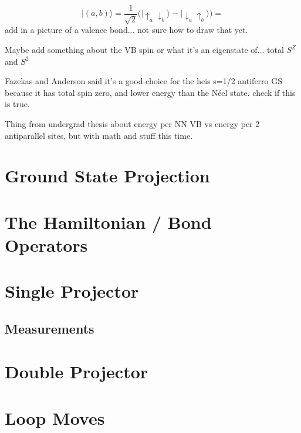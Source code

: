 \begin{equation}
   \lvert(a,b)\rangle = \frac{1}{\sqrt{2}}\big( \lvert \uparrow_a \downarrow_b \rangle - \lvert \downarrow_a \uparrow_b \rangle \big) = 
   \label{eqn_vb}
\end{equation}
{\color{red} add in a picture of a valence bond... not sure how to draw that yet.}  

{\color{red} Maybe add something about the VB spin or what it's an eigenstate of... total 
$S^Z$ and $S^2$}

{\color{red} Fazekas and Anderson said it's a good choice for the heis s=1/2 antiferro GS
because it has total spin zero, and lower energy than the N\'eel state.  check if this is true.}

{\color{red} Thing from undergrad thesis about energy per NN VB vs energy per 2 antiparallel sites,
but with math and stuff this time.}


\section{Ground State Projection}
\section{The Hamiltonian / Bond Operators}
\section{Single Projector}
\subsection{Measurements}
\section{Double Projector}
\section{Loop Moves}
